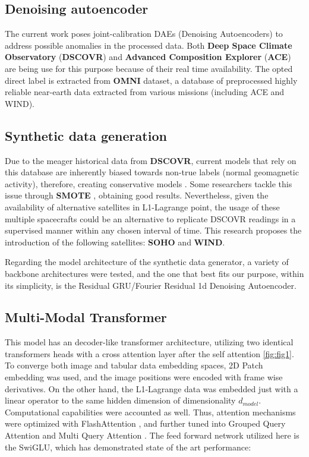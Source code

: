 \documentclass{article}
\begin{document}
\subsection{Denoising autoencoder}
The current work poses joint-calibration DAEs (Denoising Autoencoders) to address possible anomalies in the processed data. Both \textbf{Deep Space Climate Observatory} (\textbf{DSCOVR}) and \textbf{Advanced Composition Explorer} (\textbf{ACE}) are being use for this purpose because of their real time availability. The opted direct label is extracted from \textbf{OMNI} dataset, a database of preprocessed highly reliable near-earth data extracted from various missions (including ACE and WIND).

\subsection{Synthetic data generation}
Due to the meager historical data from \textbf{DSCOVR}, current models that rely on this database are inherently biased towards non-true labels (normal geomagnetic activity), therefore, creating conservative models \cite{}. Some researchers tackle this issue through \textbf{SMOTE} \cite{smote_1}, obtaining good results. Nevertheless, given the availability of alternative satellites in L1-Lagrange point, the usage of these multiple spacecrafts could be an alternative to replicate DSCOVR readings in a supervised manner within any chosen interval of time.  This research proposes the introduction of the following satellites: \textbf{SOHO} and \textbf{WIND}.

Regarding the model architecture of the synthetic data generator, a variety of backbone architectures were tested, and the one that best fits our purpose, within its simplicity, is the Residual GRU/Fourier Residual 1d Denoising Autoencoder.

\subsection{Multi-Modal Transformer}
This model has an decoder-like transformer architecture, utilizing two identical transformers heads with a cross attention layer after the self attention \ref{fig:fig1}. To converge both image and tabular data embedding spaces, 2D Patch embedding was used, and the image positions were encoded with frame wise derivatives. On the other hand, the L1-Lagrange data was embedded just with a linear operator to the same hidden dimension of dimensionality $d_{model}$. Computational capabilities were accounted as well. Thus, attention mechanisms were optimized with FlashAttention \cite{flashattention1, flashattention2}, and further tuned into Grouped Query Attention and Multi Query Attention \cite{attention1, attention2}. The feed forward network utilized here is the SwiGLU, which has demonstrated state of the art performance\cite{glu}:
\end{document}
